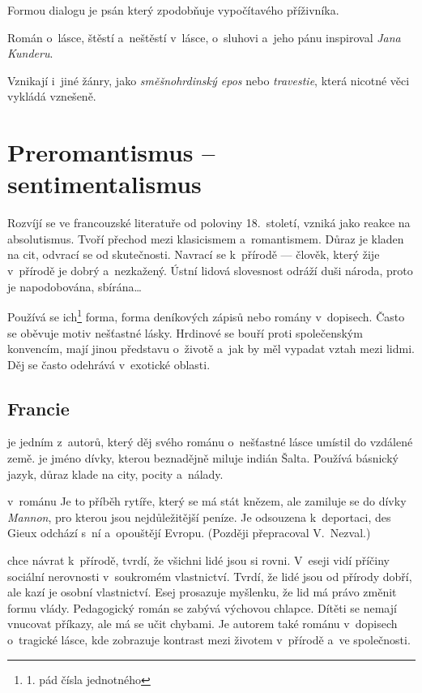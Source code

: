 Formou dialogu je psán  který zpodobňuje
vypočítavého příživníka.

Román o~lásce, štěstí a~neštěstí v~lásce, o~sluhovi a~jeho pánu
 inspiroval \emph{Jana Kunderu}.

Vznikají i~jiné žánry, jako \emph{směšnohrdinský epos} 
nebo \emph{travestie}, která nicotné věci vykládá vznešeně.

\section{Preromantismus -- sentimentalismus}
Rozvíjí se ve francouzské literatuře od poloviny 18.~století, vzniká
jako reakce na absolutismus. Tvoří přechod mezi klasicismem
a~romantismem. Důraz je kladen na cit, odvrací se od skutečnosti.
Navrací se k~přírodě --- člověk, který žije v~přírodě je dobrý
a~nezkažený. Ústní lidová slovesnost odráží duši národa, proto je
napodobována, sbírána\dots{}

Používá se ich\footnote{1. pád čísla jednotného} forma, forma deníkových
zápisů nebo romány v~dopisech. Často se oběvuje motiv nešťastné lásky.
Hrdinové se bouří proti společenským konvencím, mají jinou představu
o~životě a~jak by měl vypadat vztah mezi lidmi. Děj se často odehrává
v~exotické oblasti.

\subsection*{Francie}
 je jedním z~autorů, který děj
svého románu o~nešťastné lásce umístil do vzdálené země.  je
jméno dívky, kterou beznadějně miluje indián Šalta. Používá básnický
jazyk, důraz klade na city, pocity a~nálady.

 v~románu  Je
to příběh rytíře, který se má stát knězem, ale zamiluje se do dívky
\emph{Mannon}, pro kterou jsou nejdůležitější peníze. Je odsouzena
k~deportaci, des Gieux odchází s~ní a~opouštějí Evropu. (Později
přepracoval V.~Nezval.)

 chce návrat k~přírodě, tvrdí, že všichni
lidé jsou si rovni. V~eseji  vidí
příčiny sociální nerovnosti v~soukromém vlastnictví. Tvrdí, že lidé jsou
od přírody dobří, ale kazí je osobní vlastnictví. Esej
 prosazuje myšlenku, že lid má právo změnit
formu vlády. Pedagogický román  se zabývá výchovou chlapce.
Dítěti se nemají vnucovat příkazy, ale má se učit chybami. Je autorem
také románu v~dopisech  o~tragické lásce, 
kde zobrazuje kontrast mezi životem v~přírodě a~ve společnosti.

